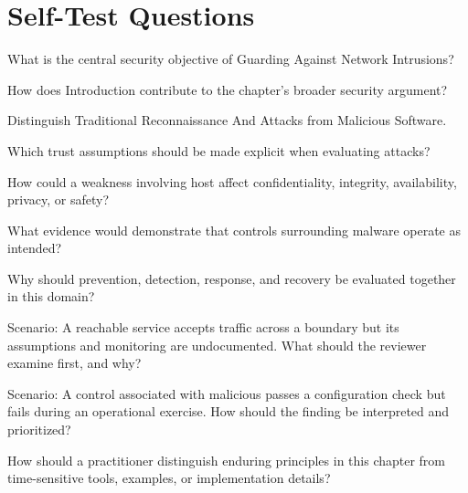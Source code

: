 \documentclass[11pt,letterpaper]{article}
\begin{document}
\section*{Self-Test Questions}
\begin{CornellRecallList}
\item What is the central security objective of Guarding Against Network Intrusions?
\item How does Introduction contribute to the chapter's broader security argument?
\item Distinguish Traditional Reconnaissance And Attacks from Malicious Software.
\item Which trust assumptions should be made explicit when evaluating attacks?
\item How could a weakness involving host affect confidentiality, integrity, availability, privacy, or safety?
\item What evidence would demonstrate that controls surrounding malware operate as intended?
\item Why should prevention, detection, response, and recovery be evaluated together in this domain?
\item Scenario: A reachable service accepts traffic across a boundary but its assumptions and monitoring are undocumented. What should the reviewer examine first, and why?
\item Scenario: A control associated with malicious passes a configuration check but fails during an operational exercise. How should the finding be interpreted and prioritized?
\item How should a practitioner distinguish enduring principles in this chapter from time-sensitive tools, examples, or implementation details?
\end{CornellRecallList}
\end{document}
